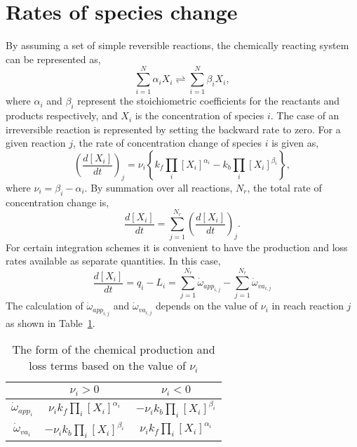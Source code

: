 \section{Rates of species change}
\label{subsec:chem_rates}
By assuming a set of simple reversible reactions,
the chemically reacting system can be represented as,
\begin{equation}
   \sum_{i=1}^N \alpha_i X_i \rightleftharpoons \sum_{i=1}^N \beta_i X_i,
\end{equation}
where $\alpha_i$ and $\beta_i$ represent the stoichiometric coefficients for the reactants and
products respectively, and $X_i$ is the concentration of species $i$.
The case of an irreversible reaction is represented by setting the backward rate to zero.
For a given reaction $j$, the rate of concentration change of species $i$ is given as,
\begin{equation}
  \left( \frac{d[X_i]}{dt} \right)_j = \nu_i \left\{ k_f \prod_i [X_i]^{\alpha_i} 
                       - k_b \prod_i [X_i]^{\beta_i} \right\},
\end{equation}
where $\nu_i = \beta_i - \alpha_i$.
By summation over all reactions, $N_r$, the total rate of concentration change is,
\begin{equation}
\label{eqn:chem_ode_system}
  \frac{d[X_i]}{dt} = \sum_{j=1}^{N_r} \left( \frac{d[X_i]}{dt} \right)_j.
\end{equation}
For certain integration schemes it is convenient to have the production and loss
rates available as separate quantities.
In this case,
\begin{equation}
\label{eq:split}
  \frac{d[X_i]}{dt} = q_i - L_i = \sum_{j=1}^{N_r} \dot{\omega}_{app_{i,j}} - \sum_{j=1}^{N_r} \dot{\omega}_{va_{i,j}} 
\end{equation}
The calculation of $\dot{\omega}_{app_{i,j}}$ and $\dot{\omega}_{va_{i,j}}$ depends on the
value of $\nu_i$ in reach reaction $j$ as shown in Table~\ref{tab:omega}.

\begin{table}[h]
\caption[Chemical production and loss terms]{The form of the chemical production and loss terms based on the value of $\nu_i$}
\label{tab:omega}
\begin{center}
\begin{tabular}{ccc}
\hline \hline
                           & $\nu_i > 0$                          & $\nu_i < 0$  \\ \hline
 $\dot{\omega}_{app_{i}}$  & $\nu_i k_f \prod_i [X_i]^{\alpha_i}$ & $-\nu_i k_b \prod_i [X_i]^{\beta_i}$ \\
 $\dot{\omega}_{va_{i}}$   & $-\nu_i k_b \prod_i [X_i]^{\beta_i}$ & $\nu_i k_f \prod_i [X_i]^{\alpha_i}$ \\ \hline \hline
\end{tabular}
\end{center}
\end{table}

